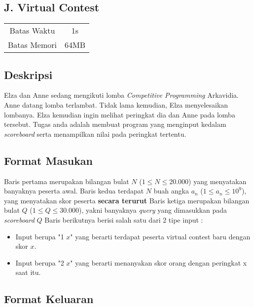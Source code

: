 \documentclass{article}
\begin{document}
\begin{center}
    \section*{J. Virtual Contest} %

    \begin{tabular}{ | c c | }
        \hline
        Batas Waktu  & 1s \\    %
        Batas Memori & 64MB \\  %
        \hline
    \end{tabular}
\end{center}

\subsection*{Deskripsi}

Elza dan Anne sedang mengikuti lomba \textit{Competitive Programming} Arkavidia. 
Anne datang lomba terlambat. Tidak lama kemudian, Elza menyelesaikan lombanya.
Elza kemudian ingin melihat peringkat dia dan Anne pada lomba tersebut.
Tugas anda adalah membuat program yang menginput kedalam \textit{scoreboard} serta menampilkan nilai pada peringkat tertentu.

\subsection*{Format Masukan}

Baris pertama merupakan bilangan bulat $N$ ($1 \leq N \leq 20.000$) yang menyatakan banyaknya peserta awal.
Baris kedua terdapat $N$ buah angka $a_n$ ($1 \leq a_n \leq 10^9$), yang menyatakan skor peserta \textbf{secara terurut}
Baris ketiga merupakan bilangan bulat $Q$ ($1 \leq Q \leq 30.000$), yakni banyaknya \textit{query} yang dimasukkan pada \textit{scoreboard}
$Q$ Baris berikutnya berisi salah satu dari 2 tipe input :
\begin{itemize}
    \setlength{\itemsep}{0pt}
    \item Input berupa "1 $x$" yang berarti terdapat peserta virtual contest baru dengan skor $x$.
    \item Input berupa "2 $x$" yang berarti menanyakan skor orang dengan peringkat x saat itu.
\end{itemize}

\subsection*{Format Keluaran}
\end{document}
